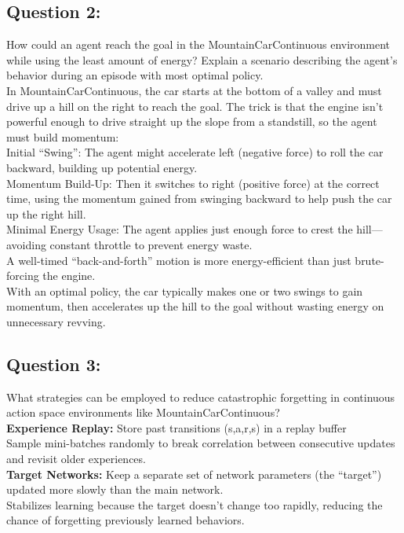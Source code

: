 \documentclass[12pt]{article}
\begin{document}
{{{				\subsection{Question 2:}
				
				How could an agent reach the goal in the MountainCarContinuous environment while using the least amount of energy? Explain a scenario describing the agent's behavior during an episode with most optimal policy.\\
				In MountainCarContinuous, the car starts at the bottom of a valley and must drive up a hill on the right to reach the goal. The trick is that the engine isn’t powerful enough to drive straight up the slope from a standstill, so the agent must build momentum:\\
				Initial “Swing”: The agent might accelerate left (negative force) to roll the car backward, building up potential energy.\\
				Momentum Build-Up: Then it switches to right (positive force) at the correct time, using the momentum gained from swinging backward to help push the car up the right hill.\\
				Minimal Energy Usage:
				The agent applies just enough force to crest the hill—avoiding constant throttle to prevent energy waste.\\
				A well-timed “back-and-forth” motion is more energy-efficient than just brute-forcing the engine.\\
				With an optimal policy, the car typically makes one or two swings to gain momentum, then accelerates up the hill to the goal without wasting energy on unnecessary revving.
				\vspace*{0.3cm}
				
				\subsection{Question 3:}
				What strategies can be employed to reduce catastrophic forgetting in continuous action space environments like MountainCarContinuous?\\
				\textbf{Experience Replay:}
				Store past transitions (s,a,r,s) in a replay buffer\\
				Sample mini-batches randomly to break correlation between consecutive updates and revisit older experiences.\\
				\textbf{Target Networks:}
				Keep a separate set of network parameters (the “target”) updated more slowly than the main network.\\
				Stabilizes learning because the target doesn’t change too rapidly, reducing the chance of forgetting previously learned behaviors.\\
				
}}}
\end{document}

